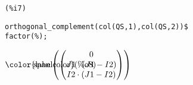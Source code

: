\noindent
\begin{minipage}[t]{8ex}
\color{red}\bf
\begin{verbatim}
(%i7) 
\end{verbatim}
\end{minipage}
\begin{minipage}[t]{\textwidth}\color{blue}
\begin{verbatim}
orthogonal_complement(col(QS,1),col(QS,2))$
factor(%);
\end{verbatim}
\end{minipage}

\noindent
\begin{math}\displaystyle
\parbox{8ex}{\color{labelcolor}(\%o8) }
\mathrm{span}\left( \begin{pmatrix}0\cr J1\cdot \left( J1-I2\right) \cr I2\cdot \left( J1-I2\right) \end{pmatrix}\right) \mbox{}
\end{math}
